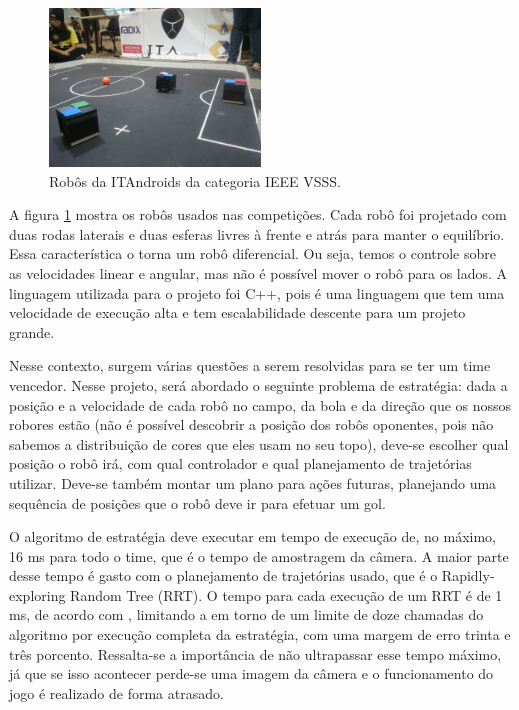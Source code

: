 \documentclass[a4paper,12pt]{article}
\begin{document}
\begin{figure}[H]
	\centering
	\includegraphics[width=0.5\textwidth]{figures/vss.JPG}
   \caption{Robôs da ITAndroids da categoria IEEE VSSS.} \label{fig:vss}
\end{figure}

A figura \ref{fig:vss} mostra os robôs usados nas competições. Cada robô foi projetado com duas rodas laterais e duas esferas livres à frente e atrás para manter o equilíbrio. Essa característica o torna um robô diferencial. Ou seja, temos o controle sobre as velocidades linear e angular, mas não é possível mover o robô para os lados. A linguagem utilizada para o projeto foi C++, pois é uma linguagem que tem uma velocidade de execução alta e tem escalabilidade descente para um projeto grande. 

Nesse contexto, surgem várias questões a serem resolvidas para se ter um time vencedor. Nesse projeto, será abordado o seguinte problema de estratégia: dada a posição e a velocidade de cada robô no campo, da bola e da direção que os nossos robores estão (não é possível descobrir a posição dos robôs oponentes, pois não sabemos a distribuição de cores que eles usam no seu topo), deve-se escolher qual posição o robô irá, com qual controlador  e qual planejamento de trajetórias utilizar. Deve-se também montar um plano para ações futuras, planejando uma sequência de posições que o robô deve ir para efetuar um gol.

O algoritmo de estratégia deve executar em tempo de execução de, no máximo, 16 ms para todo o time, que é o tempo de amostragem da câmera. A maior parte desse tempo é gasto com o planejamento de trajetórias usado, que é o Rapidly-exploring Random Tree (RRT). O tempo para cada execução de um RRT é de 1 ms, de acordo com \cite{franzoni_rrt}, limitando a em torno de um limite de doze chamadas do algoritmo por execução completa da estratégia, com uma margem de erro trinta e três porcento. Ressalta-se a importância de não ultrapassar esse tempo máximo, já que se isso acontecer perde-se uma imagem da câmera e o funcionamento do jogo é realizado de forma atrasado.
\end{document}
